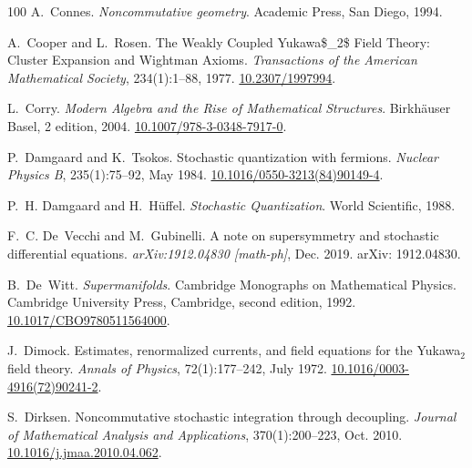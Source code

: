 \documentclass[11pt]{article}
\newcommand{\tmrsub}[1]{\ensuremath{_{\textrm{#1}}}}
\newcommand{\tmtextit}[1]{{\itshape{#1}}}
\begin{document}
\begin{thebibliography}{100}
  A.~Connes.
  {\newblock}\tmtextit{Noncommutative geometry}. {\newblock}Academic Press,
  San Diego, 1994.
  
  A.~Cooper and L.~Rosen. {\newblock}The
  Weakly Coupled Yukawa\$\_2\$ Field Theory: Cluster Expansion and Wightman
  Axioms. {\newblock}\tmtextit{Transactions of the American Mathematical
  Society}, 234(1):1--88, 1977.
  {\newblock}\href{https://doi.org/10.2307/1997994}{10.2307/1997994}.
  
  L.~Corry. {\newblock}\tmtextit{Modern Algebra
  and the Rise of Mathematical Structures}. {\newblock}Birkh{\"a}user Basel, 2
  edition, 2004. {\newblock}
  \href{https://doi.org/10.1007/978-3-0348-7917-0}{10.1007/978-3-0348-7917-0}.
  
  P.~Damgaard and K.~Tsokos.
  {\newblock}Stochastic quantization with fermions.
  {\newblock}\tmtextit{Nuclear Physics B}, 235(1):75--92, May 1984.
  {\newblock}
  \href{https://doi.org/10.1016/0550-3213(84)90149-4}{10.1016/0550-3213(84)90149-4}.
  
  P.~H. Damgaard and H.~H{\"u}ffel.
  {\newblock}\tmtextit{Stochastic Quantization}. {\newblock}World Scientific,
  1988.
  
  F.~C. De~Vecchi and M.~Gubinelli.
  {\newblock}A note on supersymmetry and stochastic differential equations.
  {\newblock}\tmtextit{arXiv:1912.04830 [math-ph]}, Dec. 2019.
  {\newblock}arXiv: 1912.04830.
  
  B.~De~Witt. {\newblock}\tmtextit{Supermanifolds}.
  {\newblock}Cambridge Monographs on Mathematical Physics. Cambridge
  University Press, Cambridge, second edition, 1992. {\newblock}
  \href{https://doi.org/10.1017/CBO9780511564000}{10.1017/CBO9780511564000}.
  
  J.~Dimock. {\newblock}Estimates,
  renormalized currents, and field equations for the Yukawa\tmrsub{$2$} field
  theory. {\newblock}\tmtextit{Annals of Physics}, 72(1):177--242, July 1972.
  {\newblock}
  \href{https://doi.org/10.1016/0003-4916(72)90241-2}{10.1016/0003-4916(72)90241-2}.
  
  S.~Dirksen.
  {\newblock}Noncommutative stochastic integration through decoupling.
  {\newblock}\tmtextit{Journal of Mathematical Analysis and Applications},
  370(1):200--223, Oct. 2010. {\newblock}
  \href{https://doi.org/10.1016/j.jmaa.2010.04.062}{10.1016/j.jmaa.2010.04.062}.
  

\end{thebibliography}
\end{document}
